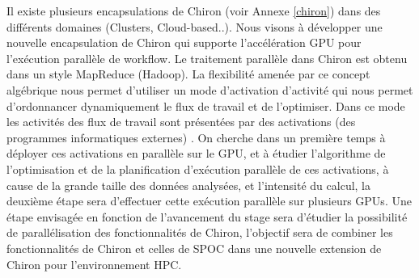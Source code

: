 Il existe plusieurs encapsulations de Chiron  (voir Annexe \ref{chiron}) dans des différents domaines (Clusters, Cloud-based..). Nous visons à développer une nouvelle encapsulation de Chiron qui supporte l'accélération GPU pour l'exécution parallèle de workflow. Le traitement parallèle dans Chiron est obtenu dans un style MapReduce (Hadoop). La flexibilité amenée par ce concept algébrique nous permet d'utiliser un mode d'activation d'activité qui nous permet d'ordonnancer dynamiquement le flux de travail et de l'optimiser. Dans ce mode les activités des flux de travail sont présentées par des activations (des programmes informatiques externes) \cite{oga13}. On cherche dans un première temps à déployer ces activations en parallèle sur le GPU, et à étudier l'algorithme de l'optimisation et de la planification d'exécution parallèle de ces activations, à cause de la grande taille des données analysées, et l'intensité du calcul, la deuxième étape sera d'effectuer cette exécution parallèle sur plusieurs GPUs.  
Une étape envisagée en fonction de l'avancement du stage sera d'étudier la possibilité de parallélisation des fonctionnalités de Chiron, l'objectif sera de combiner les fonctionnalités de Chiron et celles de SPOC dans une nouvelle extension de Chiron pour l'environnement HPC. 

%